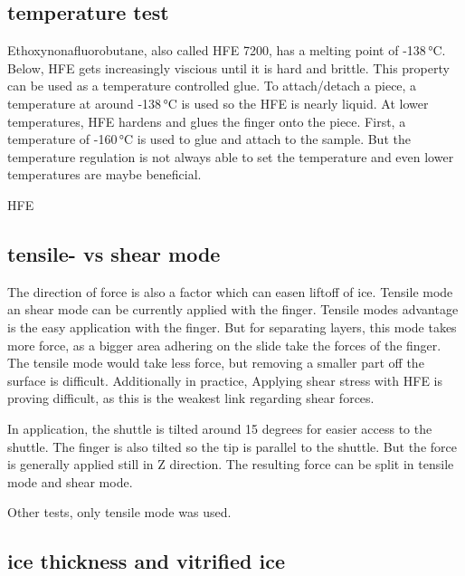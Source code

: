 \subsection{temperature test}

Ethoxynonafluorobutane, also called HFE 7200, has a melting point of -138\,°C. Below, HFE gets increasingly viscious until it is hard and brittle. This property can be used as a temperature controlled glue. To attach/detach a piece, a temperature at around -138\,°C is used so the HFE is nearly liquid. At lower temperatures, HFE hardens and glues the finger onto the piece. First, a temperature of -160\,°C is used to glue and attach to the sample. But the temperature regulation is not always able to set the temperature and even lower temperatures are maybe beneficial. 

HFE

\subsection{tensile- vs shear mode}

The direction of force is also a factor which can easen liftoff of ice. Tensile mode an shear mode can be currently applied with the finger. Tensile modes advantage is the easy application with the finger. But for separating layers, this mode takes more force, as a bigger area adhering on the slide take the forces of the finger. The tensile mode would take less force, but removing a smaller part off the surface is difficult. Additionally in practice, Applying shear stress with HFE is proving difficult, as this is the weakest link regarding shear forces.

In application, the shuttle is tilted around 15 degrees for easier access to the shuttle. The finger is also tilted so the tip is parallel to the shuttle. But the force is generally applied still in Z direction. The resulting force can be split in tensile mode and shear mode.

Other tests, only tensile mode was used.

%	

\subsection{ice thickness and vitrified ice}

